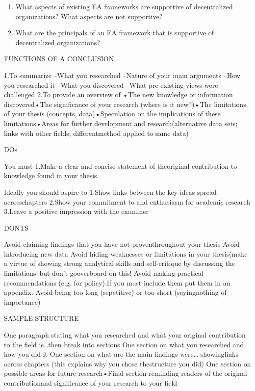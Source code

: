 \begin{enumerate}
\item What aspects of existing EA frameworks are supportive of decentralized organizations? What aspects are not supportive?
\label{req:1}
\item What are the principals of an EA framework that is supportive of decentralized organizations?
\label{req:2}
\end{enumerate}



FUNCTIONS OF A CONCLUSION

1.To summarize
 –What you researched –Nature of your main arguments –How you researched it –What you discovered –What pre-existing views were challenged
2.To provide an overview of 
•The new knowledge or information discovered•The significance of your research (where is it new?)•The limitations of your thesis (concepts, data)•Speculation on the implications of these limitations•Areas for further development and research(alternative data sets; links with other fields; differentmethod applied to same data)


DOs

You must 
1.Make a clear and concise statement of theoriginal contribution to knowledge found in your thesis.

Ideally you should aspire to
1.Show links between the key ideas spread acrosschapters
2.Show your commitment to and enthusiasm for academic research
3.Leave a positive impression with the examiner


DONTS

Avoid claiming findings that you have not proventhroughout your thesis
Avoid introducing new data
Avoid hiding weaknesses or limitations in your thesis(make a virtue of showing strong analytical skills and self-critique by discussing the limitations--but don’t gooverboard on this!
Avoid making practical recommendations (e.g. for policy).If you must include them put them in an appendix.
Avoid being too long (repetitive) or too short (sayingnothing of importance)


SAMPLE STRUCTURE

One paragraph stating what you researched and what your original contribution to the field is…then break into sections
One section on what you researched and how you did it
One section on what are the main findings were… showinglinks across chapters (this explains why you chose thestructure you did)
One section on possible areas for future research•Final section reminding readers of the original contributionand significance of your research to your field